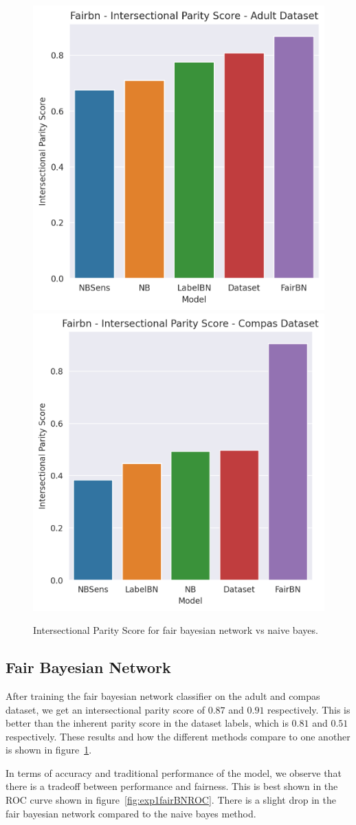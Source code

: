 \begin{figure}
    \centering
    \includegraphics[width=0.49\linewidth]{figures/adult_fairbn_parity.png}
    \includegraphics[width=0.49\linewidth]{figures/compas_fairbn_parity.png}
    \caption{Intersectional Parity Score for fair bayesian network vs naive bayes.}
    \label{fig:exp1fairBNparity}
\end{figure}

\subsection{Fair Bayesian Network}

After training the fair bayesian network classifier on the adult and compas dataset, we get an intersectional parity score of $0.87$ and $0.91$ respectively. This is better than the inherent parity score in the dataset labels, which is $0.81$ and $0.51$ respectively. These results and how the different methods compare to one another is shown in figure~\ref{fig:exp1fairBNparity}.

In terms of accuracy and traditional performance of the model, we observe that there is a tradeoff between performance and fairness. This is best shown in the ROC curve shown in figure~\ref{fig:exp1fairBNROC}. There is a slight drop in the fair bayesian network compared to the naive bayes method.

